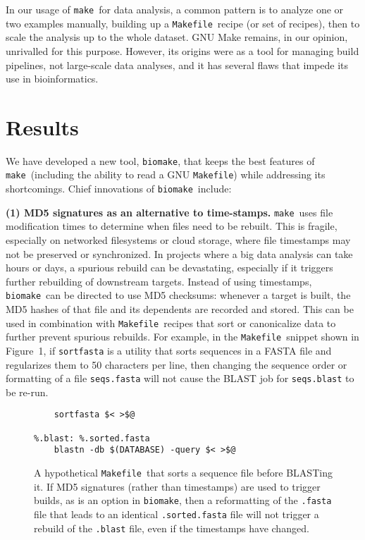 \documentclass{bioinfo}
\newcommand\Makefile{{\tt Makefile}}
\newcommand\make{{\tt make}}
\newcommand\biomake{{\tt biomake}}
\begin{document}
In our usage of \make\ for data analysis, a common pattern is to analyze one or two examples manually, building up a \Makefile\ recipe (or set of recipes),
then to scale the analysis up to the whole dataset.
GNU Make remains, in our opinion, unrivalled for this purpose.
However, its origins were as a tool for managing build pipelines, not large-scale data analyses, and it has several flaws that impede its use in bioinformatics.

\section*{Results}

We have developed a new tool, \biomake, that keeps the best features of \make\ (including the ability to read a GNU \Makefile) while addressing its shortcomings.
Chief innovations of \biomake\ include:

{\bf (1) MD5 signatures as an alternative to time-stamps.}
\make\ uses file modification times to determine when files need to be rebuilt.
This is fragile, especially on networked filesystems or cloud storage, where file timestamps may not be preserved or synchronized.
In projects where a big data analysis can take hours or days, a spurious rebuild can be devastating, especially if it triggers further rebuilding of downstream targets.
Instead of using timestamps, \biomake\ can be directed to use MD5 checksums: whenever a target is built, the MD5 hashes of that file and its dependents are recorded
and stored. This can be used in combination with \Makefile\ recipes that sort or canonicalize data to further prevent spurious rebuilds.
For example, in the \Makefile\ snippet shown in Figure~1,
if {\tt sortfasta} is a utility that sorts sequences in a FASTA file and regularizes them to 50 characters per line, then changing the sequence order or formatting
of a file {\tt seqs.fasta} will not cause the BLAST job for {\tt seqs.blast} to be re-run.

\begin{figure}[H]
\begin{Verbatim}[frame=single]
%.sorted.fasta: %.fasta
    sortfasta $< >$@

%.blast: %.sorted.fasta
    blastn -db $(DATABASE) -query $< >$@
\end{Verbatim}
\caption{
  A hypothetical \Makefile\ that sorts a sequence file before BLASTing it.
  If MD5 signatures (rather than timestamps) are used to trigger builds, as is an option in \biomake,
  then a reformatting of the {\tt .fasta} file that leads to an identical {\tt .sorted.fasta} file
  will not trigger a rebuild of the {\tt .blast} file, even if the timestamps have changed.
}
\end{figure}
\end{document}
